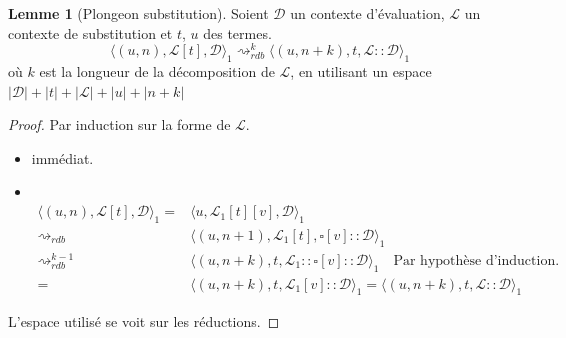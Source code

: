 \documentclass[11pt,a4paper]{article}
\theoremstyle{definition}
\newtheorem{lemma}[theorem]{Lemme}
\newcommand{\etatu}[1]{\langle #1 \rangle_1}
\newcommand{\mcd}{\mathcal{D}}
\newcommand{\mcl}{\mathcal{L}}
\begin{document}
\begin{lemma}[Plongeon substitution]
  \label{lemmaplouf2}
  Soient $\mathcal{D}$ un contexte d'évaluation, $\mcl$ un contexte de substitution et $t$, $u$ des termes.
  \[ \etatu{(u,n), \mcl[t], \mcd} \rightsquigarrow_{rdb}^k \etatu{(u,n+k), t, \mcl::\mcd} \]
  où $k$ est la longueur de la décomposition de $\mcl$,
en utilisant un espace $|\mcd|+|t|+|\mcl|+|u| + |n+k|$
\end{lemma}
\begin{proof}
  Par induction sur la forme de $\mathcal{L}$.
  \begin{itemize}
    \item {} immédiat.\\
    \item {}\\
  \begin{align*}
    \langle (u,n), \mathcal{L}[t], \mathcal{D}\rangle_1 = &\langle u, \mathcal{L}_1[t][v], \mathcal{D}\rangle_1 \\
    \rightsquigarrow_{rdb} &\langle (u,n+1), \mathcal{L}_1[t], \square[v]:: \mathcal{D}\rangle_1 \\
  \rightsquigarrow^{k-1}_{rdb} &\langle (u,n+k), t, \mathcal{L}_1:: \square[v]:: \mathcal{D}\rangle_1 \quad \text{Par hypothèse d'induction.}\\
 = &\etatu{(u,n+k), t, \mcl_1[v]::\mcd} = \etatu{(u,n+k), t, \mcl::\mcd}
  \end{align*}
  \end{itemize}
  L'espace utilisé se voit sur les réductions.
\end{proof}
\end{document}
